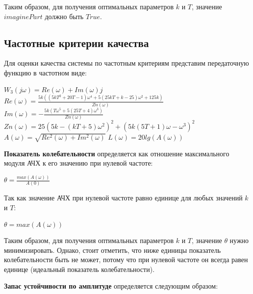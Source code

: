 \documentclass[14pt,a4paper,report]{report}
\begin{document}
Таким образом, для получения оптимальных параметров $k$ и $T$, значение $imaginePart$ должно быть $True$.

\subsection{Частотные критерии качества}

Для оценки качества системы по частотным критериям представим передаточную функцию в частотном виде:

\begin{center}
$W_3(j\omega)=Re(\omega)+Im(\omega)j$  \linebreak \linebreak
$Re(\omega)=\frac{5k((5kT^2+20T-1)\omega^4+5(25kT+k-25)\omega^2+125k)}{Zn(\omega)}$ \linebreak \linebreak
$Im(\omega)=-\frac{5k(T\omega^5+5(25T+4)\omega^3)}{Zn(\omega)}$ \linebreak \linebreak
$Zn(\omega)=25(5k-(kT+5)\omega^2)^2+(5k(5T+1)\omega-\omega^3)^2$ \linebreak \linebreak
$A(\omega)=\sqrt{Re^2(\omega)+Im^2(\omega)}$ \linebreak \linebreak
$L(\omega)=20lg(A(\omega))$
\end{center}

\textbf{Показатель колебательности} определяется как отношение максимального модуля АЧХ к его значению при нулевой частоте:

\begin{center}
$\theta=\frac{max(A(\omega))}{A(0)}$
\end{center}

Так как значение АЧХ при нулевой частоте равно единице для любых значений $k$ и $T$:

\begin{center}
$\theta=max(A(\omega))$
\end{center}

Таким образом, для получения оптимальных параметров $k$ и $T$, значение $\theta$ нужно минимизировать. Однако, стоит отметить, что ниже единицы показатель колебательности быть не может, потому что при нулевой частоте он всегда равен единице (идеальный показатель колебательности).

\textbf{Запас устойчивости по амплитуде} определяется следующим образом:
\end{document}
